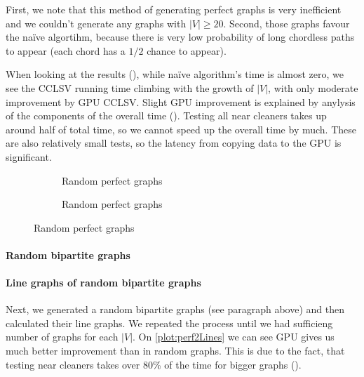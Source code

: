 First, we note that this method of generating perfect graphs is very inefficient and we couldn't generate any graphs with $|V| \geq 20$. Second, those graphs favour the na\"ive algortihm, because there is very low probability of long chordless paths to appear (each chord has a $1/2$ chance to appear).

When looking at the results (), while na\"ive algorithm's time is almost zero, we see the CCLSV running time climbing with the growth of $|V|$, with only moderate improvement by GPU CCLSV. Slight GPU improvement is explained by anylysis of the components of the overall time (). Testing all near cleaners takes up around half of total time, so we cannot speed up the overall time by much. These are also relatively small tests, so the latency from copying data to the GPU is significant.


\begin{figure}
  \begin{subfigure}{\textwidth}
    \centering
    
    \caption{Random perfect graphs}
    \label{plot:perfLines}
  \end{subfigure}

  \begin{subfigure}{\textwidth}
    \centering
    
    \caption{Random perfect graphs}
    \label{plot:perfDet}
  \end{subfigure}
  \caption{Random perfect graphs}
\end{figure}

\paragraph{Random bipartite graphs}

\paragraph{Line graphs of random bipartite graphs}
Next, we generated a random bipartite graphs (see paragraph above) and then calculated their line graphs. We repeated the process until we had sufficieng number of graphs for each $|V|$. On \cref{plot:perf2Lines} we can see GPU gives us much better improvement than in random graphs. This is due to the fact, that testing near cleaners takes over 80\% of the time for bigger graphs ().

